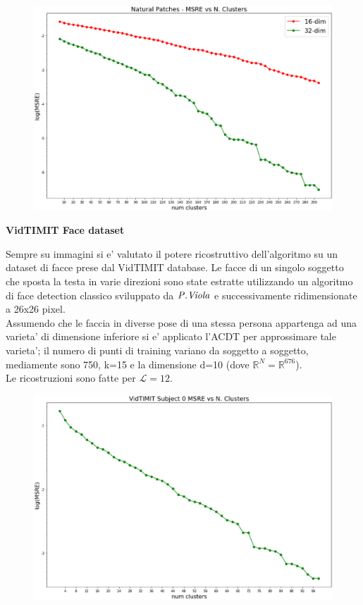 \documentclass[a4, landscape]{seminar}
\theoremstyle{definition}
\newcommand{\RR}{\mathbb{R}}
\def\bc{\begin{center}}
\def\ec{\end{center}}
\def\bs{\begin{slide}\begingroup\small}
\def\es{\endgroup\end{slide}}
\begin{document}
\bs
\begin{figure}[b]
\centering
\includegraphics[width=\textwidth]{naturalpatches.eps}
\end{figure}
\es

\bs
\bc{\bf\color{blue}VidTIMIT Face dataset}\ec
Sempre su immagini si e' valutato il potere ricostruttivo dell'algoritmo su un dataset di facce
prese dal VidTIMIT database. Le facce di un singolo soggetto che sposta la testa in varie direzioni sono
state estratte utilizzando un algoritmo di face detection classico sviluppato da $\it{P.Viola}$ e successivamente
ridimensionate a 26x26 pixel. \\
Assumendo che le faccia in diverse pose di una stessa persona appartenga ad una varieta' di dimensione inferiore si e' applicato
l'ACDT per approssimare tale varieta'; il numero di punti di training variano da soggetto a soggetto, mediamente sono 750,
k=15 e la dimensione d=10 (dove $\RR^{N} = \RR^{676}$). \\
Le ricostruzioni sono fatte per $\mathcal{L}=12$.
\es

\bs
\begin{figure}[b]
\centering
\includegraphics[width=\textwidth]{vidtimit_msre.eps}
\end{figure}
\es
\end{document}
